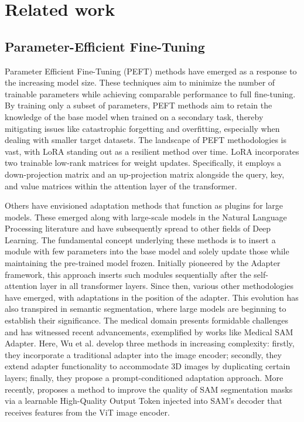 \section{Related work}
\label{sec:samda_related}
\subsection{Parameter-Efficient Fine-Tuning} 
Parameter Efficient Fine-Tuning (PEFT) methods have emerged as a response to the increasing model size. These techniques aim to minimize the number of trainable parameters while achieving comparable performance to full fine-tuning. By training only a subset of parameters, PEFT methods aim to retain the knowledge of the base model when trained on a secondary task, thereby mitigating issues like catastrophic forgetting and overfitting, especially when dealing with smaller target datasets. The landscape of PEFT methodologies is vast, with LoRA standing out as a resilient method over time. LoRA incorporates two trainable low-rank matrices for weight updates. Specifically, it employs a down-projection matrix and an up-projection matrix alongside the query, key, and value matrices within the attention layer of the transformer.

Others have envisioned adaptation methods that function as plugins for large models. These emerged along with large-scale models in the Natural Language Processing literature and have subsequently spread to other fields of Deep Learning. The fundamental concept underlying these methods is to insert a module with few parameters into the base model and solely update those while maintaining the pre-trained model frozen. Initially pioneered by the Adapter framework, this approach inserts such modules sequentially after the self-attention layer in all transformer layers. Since then, various other methodologies have emerged, with adaptations in the position of the adapter. This evolution has also transpired in semantic segmentation, where large models are beginning to establish their significance. The medical domain presents formidable challenges and has witnessed recent advancements, exemplified by works like Medical SAM Adapter. Here, Wu et al. develop three methods in increasing complexity: firstly, they incorporate a traditional adapter into the image encoder; secondly, they extend adapter functionality to accommodate 3D images by duplicating certain layers; finally, they propose a prompt-conditioned adaptation approach. More recently, \cite{ke2024segment} proposes a method to improve the quality of SAM segmentation masks via a learnable High-Quality Output Token injected into SAM's decoder that receives features from the ViT image encoder.

